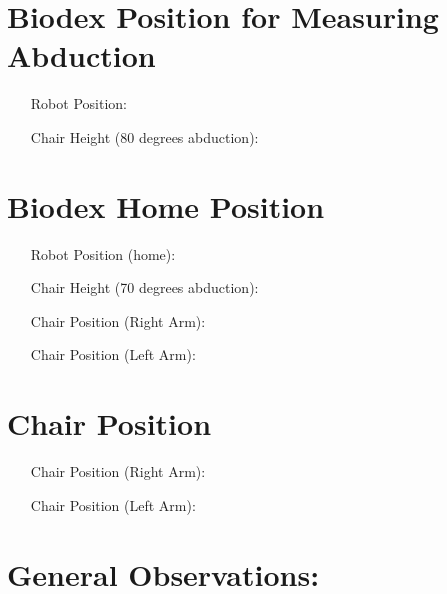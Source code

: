 \documentclass[11pt]{article}
\begin{document}
\section*{Biodex Position for Measuring Abduction}
\begin{itemize}[leftmargin=2in]
\item[Robot Position:]
\item[Chair Height (80 degrees abduction):]
\end{itemize}

\section*{Biodex Home Position}
\begin{itemize}[leftmargin=2in]
\item[Robot Position (home):]
\item[Chair Height (70 degrees abduction):]
\item[Chair Position (Right Arm):]
\item[Chair Position (Left Arm):]
\end{itemize}

\section*{Chair Position}
\begin{itemize}[leftmargin=2in]
\item[Chair Position (Right Arm):]
\item[Chair Position (Left Arm):]
\end{itemize}

\section*{General Observations:}
\end{document}

